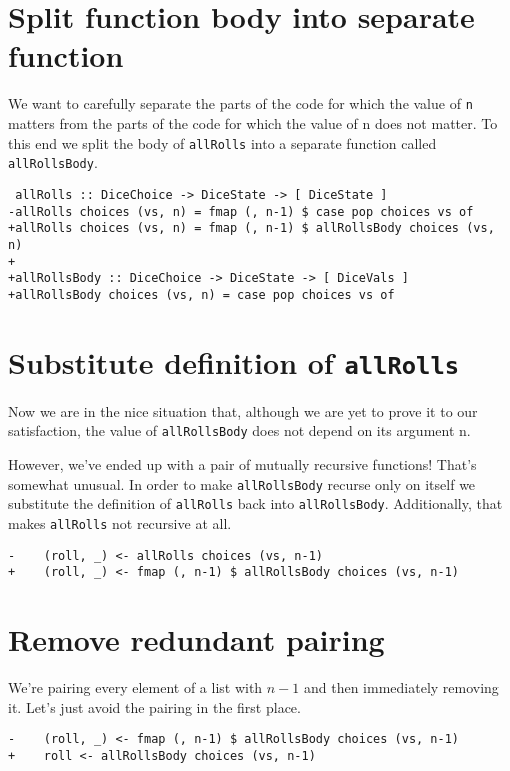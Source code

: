 \section{Split function body into separate function}


We want to carefully separate the parts of the code for which the value of \texttt{n} matters from the parts of the code for which the value of n does not matter. To this end we split the body of \texttt{allRolls} into a separate function called \texttt{allRollsBody}.

\begin{verbatim}
 allRolls :: DiceChoice -> DiceState -> [ DiceState ]
-allRolls choices (vs, n) = fmap (, n-1) $ case pop choices vs of
+allRolls choices (vs, n) = fmap (, n-1) $ allRollsBody choices (vs, n)
+
+allRollsBody :: DiceChoice -> DiceState -> [ DiceVals ]
+allRollsBody choices (vs, n) = case pop choices vs of
\end{verbatim}


\section{Substitute definition of \texttt{allRolls}}

Now we are in the nice situation that, although we are yet to prove it to our satisfaction, the value of \texttt{allRollsBody} does not depend on its argument n.

However, we've ended up with a pair of mutually recursive functions! That's somewhat unusual. In order to make \texttt{allRollsBody} recurse only on itself we substitute the definition of \texttt{allRolls} back into \texttt{allRollsBody}. Additionally, that makes \texttt{allRolls} not recursive at all.

\begin{verbatim}
-    (roll, _) <- allRolls choices (vs, n-1)
+    (roll, _) <- fmap (, n-1) $ allRollsBody choices (vs, n-1)
\end{verbatim}


\section{Remove redundant pairing}


We're pairing every element of a list with $n-1$ and then immediately removing it. Let's just avoid the pairing in the first place.

\begin{verbatim}
-    (roll, _) <- fmap (, n-1) $ allRollsBody choices (vs, n-1)
+    roll <- allRollsBody choices (vs, n-1)
\end{verbatim}


